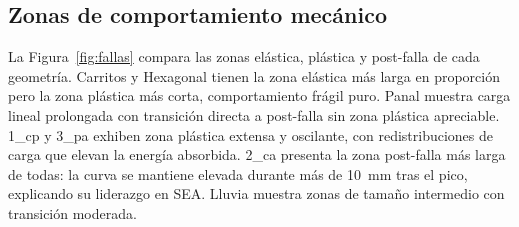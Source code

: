\documentclass[12pt, a4paper, twocolumn]{article}
\begin{document}
\subsection{Zonas de comportamiento mecánico}

La Figura~\ref{fig:fallas} compara las zonas elástica, plástica y post-falla de cada
geometría. Carritos y Hexagonal tienen la zona elástica más larga en proporción pero
la zona plástica más corta, comportamiento frágil puro. Panal muestra carga lineal
prolongada con transición directa a post-falla sin zona plástica apreciable. 1\_cp
y 3\_pa exhiben zona plástica extensa y oscilante, con redistribuciones de carga que
elevan la energía absorbida. 2\_ca presenta la zona post-falla más larga de todas:
la curva se mantiene elevada durante más de \SI{10}{mm} tras el pico, explicando su
liderazgo en SEA. Lluvia muestra zonas de tamaño intermedio con transición moderada.
\end{document}
